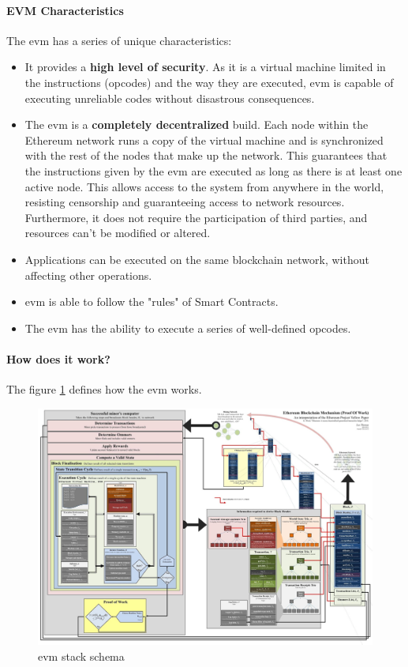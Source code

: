 \paragraph{EVM Characteristics}
The \acrshort{evm} has a series of unique characteristics\cite{ethereumGavin,ethereumDocu}:
\begin{itemize}
    \item It provides a \textbf{high level of security}. As it is a virtual machine limited in the instructions (opcodes) and the way they are executed, \acrshort{evm} is capable of executing unreliable codes without disastrous consequences.
    \item The \acrshort{evm} is a \textbf{completely decentralized} build. Each node within the Ethereum network runs a copy of the virtual machine and is synchronized with the rest of the nodes that make up the network. This guarantees that the instructions given by the \acrshort{evm} are executed as long as there is at least one active node. This allows access to the system from anywhere in the world, resisting censorship and guaranteeing access to network resources. Furthermore, it does not require the participation of third parties, and resources can't be modified or altered.
    \item Applications can be executed on the same blockchain network, without affecting other operations.
    \item \acrshort{evm} is able to follow the "rules" of Smart Contracts.
    \item The \acrshort{evm} has the ability to execute a series of well-defined opcodes.
\end{itemize}

\paragraph{How does it work?}
The figure \ref{fig:blockchain_stack} defines how the \acrshort{evm} works\cite{queEsEvm}.
\begin{figure}[h]
    \centering
    \includegraphics[width=1\textwidth]{images/State of the Art/ethereum/evm-stack.jpeg}
    \caption{\acrshort{evm} stack schema}
    \label{fig:blockchain_stack}
\end{figure}

